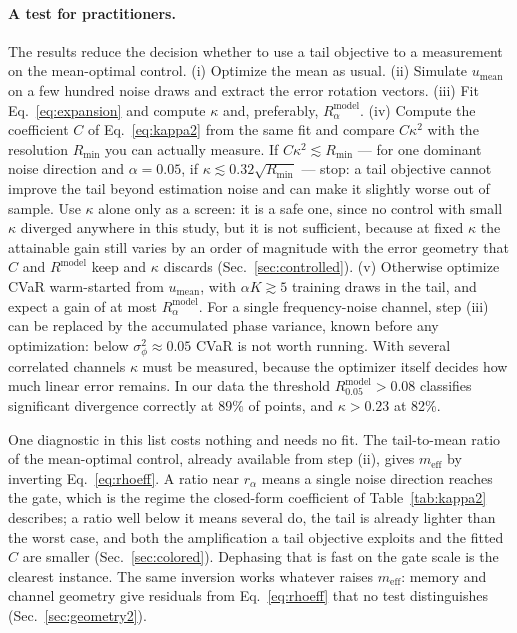 \documentclass[aps,pra,twocolumn,superscriptaddress,reprint,nofootinbib,floatfix]{revtex4-2}
\theoremstyle{definition}
\newcommand{\Rm}{R^{\mathrm{model}}}
\newcommand{\umean}{u_{\mathrm{mean}}}
\begin{document}
\paragraph*{A test for practitioners.} The results reduce the decision
whether to use a tail objective to a measurement on the mean-optimal control.
(i) Optimize the mean as usual. (ii) Simulate $\umean$ on a few hundred noise
draws and extract the error rotation vectors. (iii) Fit
Eq.~\eqref{eq:expansion} and compute $\kappa$ and, preferably, $\Rm_\alpha$.
(iv) Compute the coefficient $C$ of Eq.~\eqref{eq:kappa2} from the same
fit and compare $C\kappa^2$ with the resolution $R_{\min}$ you can actually
measure. If $C\kappa^2\lesssim R_{\min}$ --- for one dominant noise direction
and $\alpha=0.05$, if $\kappa\lesssim0.32\sqrt{R_{\min}}$ --- stop: a tail
objective cannot improve the tail beyond estimation noise and can make it
slightly worse out of sample. Use $\kappa$ alone only as a screen: it is a
safe one, since no control with small $\kappa$ diverged anywhere in this study,
but it is not sufficient, because at fixed $\kappa$ the attainable gain still
varies by an order of magnitude with the error geometry that $C$ and $\Rm$
keep and $\kappa$ discards (Sec.~\ref{sec:controlled}). (v) Otherwise optimize CVaR warm-started from
$\umean$, with $\alpha K\gtrsim5$ training draws in the tail, and expect a gain
of at most $\Rm_\alpha$. For a single frequency-noise channel, step (iii) can be
replaced by the accumulated phase variance, known before any optimization:
below $\sigma_\phi^2\approx0.05$ CVaR is not worth running. With several
correlated channels $\kappa$ must be measured, because the optimizer itself
decides how much linear error remains. In our data the threshold
$\Rm_{0.05}>0.08$ classifies significant divergence correctly at 89\% of
points, and $\kappa>0.23$ at 82\%.

One diagnostic in this list costs nothing and needs no fit. The tail-to-mean
ratio of the mean-optimal control, already available from step (ii), gives
$m_{\mathrm{eff}}$ by inverting Eq.~\eqref{eq:rhoeff}. A ratio near $r_\alpha$
means a single noise direction reaches the gate, which is the regime the
closed-form coefficient of Table~\ref{tab:kappa2} describes; a ratio well
below it means several do, the tail is already lighter than the worst case,
and both the amplification a tail objective exploits and the fitted $C$ are
smaller (Sec.~\ref{sec:colored}). Dephasing that is fast on the gate scale is
the clearest instance. The same inversion works whatever raises
$m_{\mathrm{eff}}$: memory and channel geometry give residuals from
Eq.~\eqref{eq:rhoeff} that no test distinguishes (Sec.~\ref{sec:geometry2}).
\end{document}
